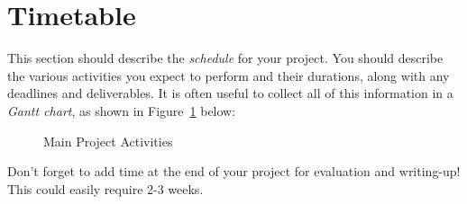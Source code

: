 \documentclass[a4paper,12pt]{article}
\begin{document}
\section*{Timetable}

This section should describe the {\em schedule} for your project. 
You should describe the various activities you expect to perform
and their durations, along with any deadlines and deliverables.
It is often useful to collect all of this information in a
{\em Gantt chart}, as shown in Figure~\ref{fig:plan} below:

\begin{figure}[htb]
\begin{center}
\caption{Main Project Activities\label{fig:plan}}
\end{center}
\end{figure}


Don't forget to add time at the end of your project for 
evaluation and writing-up! This could easily require 2-3 weeks.



\end{document}
